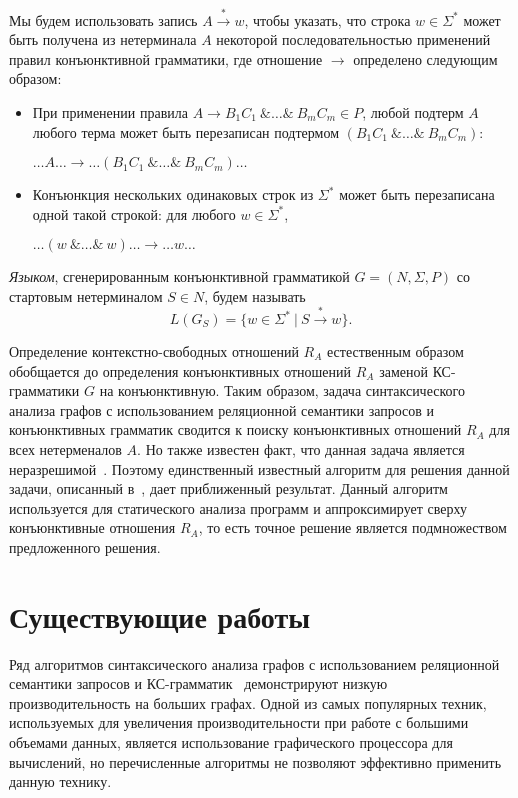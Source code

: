 \documentclass [a4paper] {article}
\begin{document}
	Мы будем использовать запись $A \xrightarrow{*} w$, чтобы указать, что строка $w \in \Sigma^*$ может быть получена из нетерминала $A$ некоторой последовательностью применений правил конъюнктивной грамматики, где отношение $\rightarrow$ определено следующим образом:
	\begin{itemize}
		\item При применении правила $A \rightarrow B_1 C_1~\& \ldots \&~B_m C_m \in P$, любой подтерм $A$ любого терма может быть перезаписан подтермом $(B_1 C_1 ~\& \ldots \&~ B_m C_m)$:
		\begin{center}
			$\ldots A \ldots \rightarrow \ldots (B_1 C_1~\& \ldots \&~B_m C_m) \ldots$
		\end{center}
		\item Конъюнкция нескольких одинаковых строк из $\Sigma^*$ может быть перезаписана одной такой строкой: для любого $w \in \Sigma^*$,
		\begin{center}
			$\ldots (w~\& \ldots \&~w) \ldots \rightarrow \ldots w \ldots$
		\end{center}
	
	\end{itemize}
	
	\textit{Языком}, сгенерированным конъюнктивной грамматикой $G = (N,\Sigma,P)$ со стартовым нетерминалом $S \in N$, будем называть $$L(G_S) = \{w \in \Sigma^*~|~S \xrightarrow{*} w\}.$$
	
	Определение контекстно-свободных отношений $R_A$ естественным образом обобщается до определения конъюнктивных отношений $R_A$ заменой КС-грамматики $G$ на конъюнктивную. Таким образом, задача синтаксического анализа графов с использованием реляционной семантики запросов и конъюнктивных грамматик сводится к поиску конъюнктивных отношений $R_A$ для всех нетерменалов $A$. Но также известен факт, что данная задача является неразрешимой~\cite{hellingsRelational}. Поэтому единственный известный алгоритм для решения данной задачи, описанный в~\cite{zhang2017context}, дает приближенный результат. Данный алгоритм используется для статического анализа программ и аппроксимирует сверху конъюнктивные отношения $R_A$, то есть точное решение является подмножеством предложенного решения.
	
	
	\section{Существующие работы}
	
	Ряд алгоритмов синтаксического анализа графов с использованием реляционной семантики запросов и КС-грамматик~\cite{hellingsRelational, RDF, GraphQueryWithEarley} демонстрируют низкую производительность на больших графах. Одной из самых популярных техник, используемых для увеличения производительности при работе с большими объемами данных, является использование графического процессора для вычислений, но перечисленные алгоритмы не позволяют эффективно применить данную технику.
	
\end{document}

